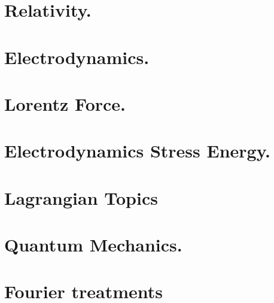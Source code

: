 \documentclass[12pt,leqno]{book}
\begin{document}
\part{Relativity.}






\part{Electrodynamics.}















\part{Lorentz Force.}




\part{Electrodynamics Stress Energy.}








\part{Lagrangian Topics}













\part{Quantum Mechanics.}





\part{Fourier treatments}









\end{document}
